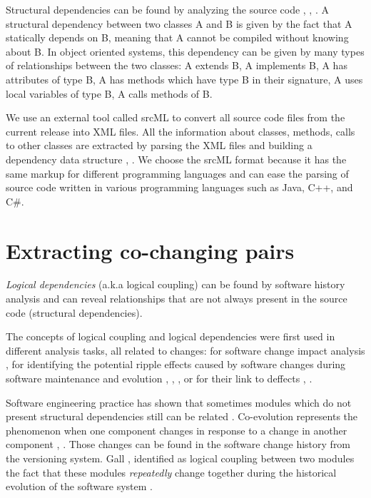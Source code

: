 \documentclass[12pt, a4paper, twoside]{report}
\begin{document}
Structural dependencies can be found by analyzing the source code \cite{Sangal:2005:UDM:1094811.1094824}, \cite{CalloArias2011}, \cite{structdep}. A structural dependency between two classes A and B is given by the fact that A statically depends on B, meaning that A cannot be compiled without knowing about B. In object oriented systems, this dependency can be given by many types of relationships between the two classes: A extends B, A implements B, A has attributes of type B, A has methods which have type B in their signature, A uses local variables of type B, A calls methods of B.


 We use an external tool called srcML \cite{srcML} to convert all source code files from the current release into XML files. All the information about classes, methods, calls to other classes are extracted by parsing the XML files and building a dependency data structure \cite{2003:XLC:851042.857028},
\cite{Collard:2011:LTF:2067850.2068011}. We choose the srcML format because it has the same markup for different programming languages and can ease the parsing of source code written in various programming languages such as Java, C++, and C\#.


\section{Extracting co-changing pairs}
\label{sec:copairs_extraction}

\textit{Logical dependencies} (a.k.a logical coupling) can be found by software history analysis and can reveal relationships that are not always present in the source code (structural dependencies).  

The concepts of logical coupling and logical dependencies were first used in different analysis tasks, all related to changes: for software change impact analysis \cite{1553643}, for identifying the potential ripple effects caused by software changes during software maintenance and evolution \cite{DBLP:conf/issre/OlivaG15}, \cite{Oliva:2011:ISL:2067853.2068086}, \cite{Poshyvanyk2009}, \cite{posh2010} or for their link to deffects \cite{wiese}, \cite{Zimmermann:2004:MVH:998675.999460}.

Software engineering practice has shown that sometimes modules which do not present structural dependencies still can be related \cite{articleEvolution}. Co-evolution represents the phenomenon when one component changes in response to a change in another component \cite{Yu:2007:UCC:1231330.1231370}, \cite{5166450}. Those changes can be found in the software change history from the versioning system. Gall \cite{Gall:1998:DLC:850947.853338}, \cite{Gall:2003:CRH:942803.943741} identified as logical coupling between two modules the fact that these modules \textit{repeatedly} change together during the historical evolution of the software system \cite{6606615}.
\end{document}
